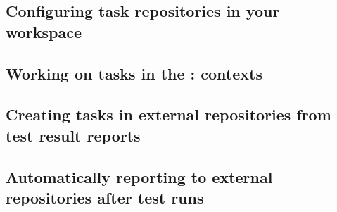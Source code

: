 

\subsection{Configuring task repositories in your workspace}
\label{TasksALMConfigureWorkspace}


\subsection{Working on tasks in the \ite{}: contexts}


\subsection{Creating tasks in external repositories from test result reports}


\subsection{Automatically reporting to external repositories after test runs}
\label{TasksALMReport}


